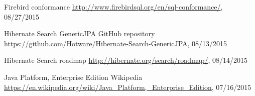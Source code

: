 \begin{thebibliography}{100}
	 Firebird conformance
	\url{http://www.firebirdsql.org/en/sql-conformance/}, 08/27/2015
	
	 Hibernate Search GenericJPA GitHub repository
	\url{https://github.com/Hotware/Hibernate-Search-GenericJPA}, 08/13/2015
	
	 Hibernate Search roadmap
	\url{http://hibernate.org/search/roadmap/}, 08/14/2015
	
	 Java Platform, Enterprise Edition
	Wikipedia
	\url{https://en.wikipedia.org/wiki/Java_Platform,_Enterprise_Edition}, 07/16/2015
	
\end{thebibliography}

\pagebreak
~
